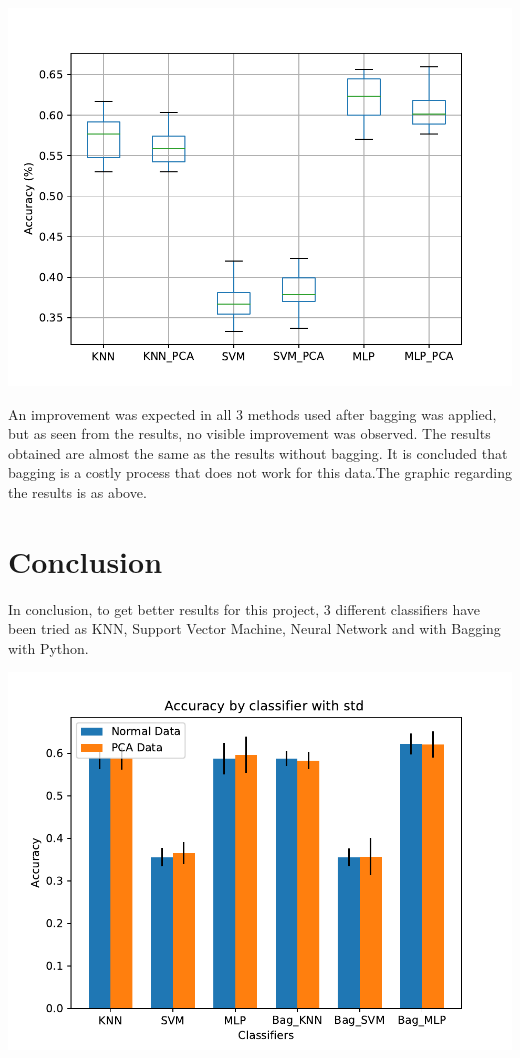 \documentclass{article}
\begin{document}
\begin{center}
    \vspace{1em}
        \includegraphics[scale=0.75]{graphs/BaggingClassifier.pdf}
    \vspace{1em}
\end{center}

An improvement was expected in all 3 methods used after bagging was applied, but as seen from the results, no visible improvement was observed. The results obtained are almost the same as the results without bagging. It is concluded that bagging is a costly process that does not work for this data.The graphic regarding the results is as above.


\section{ Conclusion}

In conclusion, to get better results for this project, 3 different classifiers have been tried as KNN, Support Vector Machine,  Neural Network and with Bagging  with Python. 

\begin{center}
    \vspace{1em}
        \includegraphics[scale=0.75]{graphs/GeneralAccuracy_BarPlot_ErrorBar.pdf}
    \vspace{1em}
\end{center}
\end{document}
